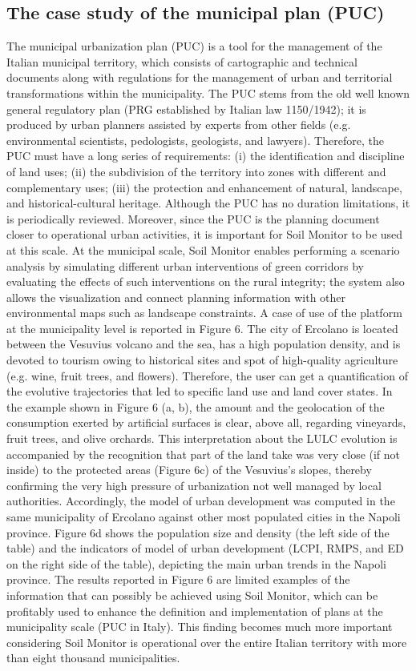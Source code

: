 \documentclass[APA,LATO1COL,doublespace]{WileyNJD-v2}
\begin{document}
\subsection{The case study of the municipal plan (PUC)}
The municipal urbanization plan (PUC) is a tool for the management of the Italian municipal territory, which consists of cartographic and technical documents along with regulations for the management of urban and territorial transformations within the municipality.
The PUC stems from the old well known general regulatory plan (PRG established by Italian law 1150/1942); it is produced by urban planners assisted by experts from other fields (e.g. environmental scientists, pedologists, geologists, and lawyers).
Therefore, the PUC must have a long series of requirements: (i) the identification and discipline of land uses; (ii) the subdivision of the territory into zones with different and complementary uses; (iii) the protection and enhancement of natural, landscape, and historical-cultural heritage. Although the PUC has no duration limitations, it is periodically reviewed. Moreover, since the PUC is the planning document closer to operational urban activities, it is important for Soil Monitor to be used at this scale. At the municipal scale, Soil Monitor enables performing a scenario analysis by simulating different urban interventions of green corridors by evaluating the effects of such interventions on the rural integrity; the system also allows the visualization and connect planning information with other environmental maps such as landscape constraints.
A case of use of the platform at the municipality level is reported in Figure 6. The city of Ercolano is located between the Vesuvius volcano and the sea, has a high population density, and is devoted to tourism owing to historical sites and spot of high-quality agriculture (e.g. wine, fruit trees, and flowers). Therefore, the user can get a quantification of the evolutive trajectories that led to specific land use and land cover states. In the example shown in Figure 6 (a, b), the amount and the geolocation of the consumption exerted by artificial surfaces is clear, above all, regarding vineyards, fruit trees, and olive orchards. This interpretation about the LULC evolution is accompanied by the recognition that part of the land take was very close (if not inside) to the protected areas (Figure 6c) of the Vesuvius’s slopes, thereby confirming the very high pressure of urbanization not well managed by local authorities. Accordingly, the model of urban development was computed in the same municipality of Ercolano against other most populated cities in the Napoli province. Figure 6d shows the population size and density (the left side of the table) and the indicators of model of urban development (LCPI, RMPS, and ED on the right side of the table), depicting the main urban trends in the Napoli province. The results reported in Figure 6 are limited examples of the information that can possibly be achieved using Soil Monitor, which can be profitably used to enhance the definition and implementation of plans at the municipality scale (PUC in Italy). This finding becomes much more important considering Soil Monitor is operational over the entire Italian territory with more than eight thousand municipalities.
\end{document}
